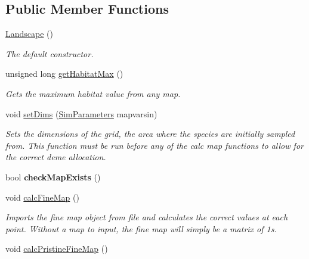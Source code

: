 \subsection*{Public Member Functions}
\begin{DoxyCompactItemize}
\item 
\hyperlink{class_landscape_a0a54d8aabc38c0a5aa27ccace3f91915}{Landscape} ()\hypertarget{class_landscape_a0a54d8aabc38c0a5aa27ccace3f91915}{}\label{class_landscape_a0a54d8aabc38c0a5aa27ccace3f91915}

\begin{DoxyCompactList}\small\item\em The default constructor. \end{DoxyCompactList}\item 
unsigned long \hyperlink{class_landscape_a99fac44043825a97e2e7fbc71caeb8e2}{get\+Habitat\+Max} ()
\begin{DoxyCompactList}\small\item\em Gets the maximum habitat value from any map. \end{DoxyCompactList}\item 
void \hyperlink{class_landscape_ada47f3fe942c488675a924a79fdd287f}{set\+Dims} (\hyperlink{struct_sim_parameters}{Sim\+Parameters} mapvarsin)
\begin{DoxyCompactList}\small\item\em Sets the dimensions of the grid, the area where the species are initially sampled from. This function must be run before any of the calc map functions to allow for the correct deme allocation. \end{DoxyCompactList}\item 
bool {\bfseries check\+Map\+Exists} ()\hypertarget{class_landscape_ab7d8cd906a44c24a7f120362563d1217}{}\label{class_landscape_ab7d8cd906a44c24a7f120362563d1217}

\item 
void \hyperlink{class_landscape_ad500af94a2afd577e682b3c042cab217}{calc\+Fine\+Map} ()\hypertarget{class_landscape_ad500af94a2afd577e682b3c042cab217}{}\label{class_landscape_ad500af94a2afd577e682b3c042cab217}

\begin{DoxyCompactList}\small\item\em Imports the fine map object from file and calculates the correct values at each point. Without a map to input, the fine map will simply be a matrix of 1s. \end{DoxyCompactList}\item 
void \hyperlink{class_landscape_a43ef527fd2272381ba20c6f6d8e471bd}{calc\+Pristine\+Fine\+Map} ()\hypertarget{class_landscape_a43ef527fd2272381ba20c6f6d8e471bd}{}\label{class_landscape_a43ef527fd2272381ba20c6f6d8e471bd}


\end{DoxyCompactItemize}
